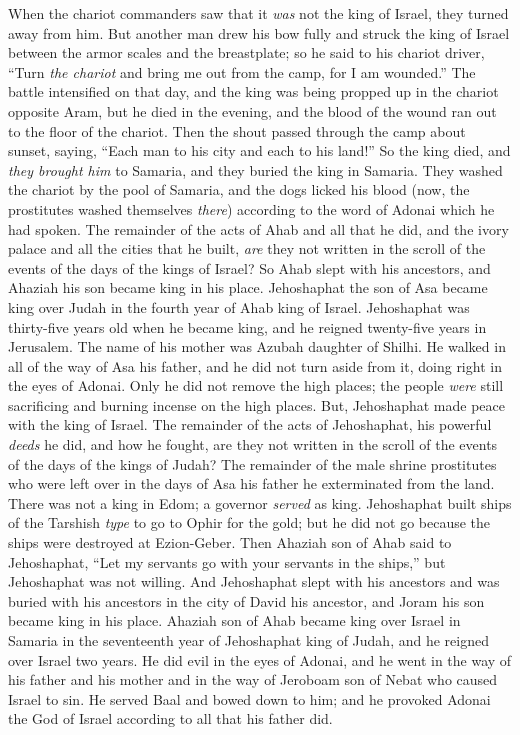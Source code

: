 \begin{biblechapter}
\verse When the chariot commanders saw that it \textit{was} not the king of Israel, they turned away from him.
\verse But another man drew his bow fully and struck the king of Israel between the armor scales and the breastplate; so he said to his chariot driver, “Turn \textit{the chariot} and bring me out from the camp, for I am wounded.”
\verse The battle intensified on that day, and the king was being propped up in the chariot opposite Aram, but he died in the evening, and the blood of the wound ran out to the floor of the chariot.
\verse Then the shout passed through the camp about sunset, saying, “Each man to his city and each to his land!”
\verse So the king died, and \textit{they brought him} to Samaria, and they buried the king in Samaria.
\verse They washed the chariot by the pool of Samaria, and the dogs licked his blood (now, the prostitutes washed themselves \textit{there}) according to the word of Adonai which he had spoken.
\verse The remainder of the acts of Ahab and all that he did, and the ivory palace and all the cities that he built, \textit{are} they not written in the scroll of the events of the days of the kings of Israel?
\verse So Ahab slept with his ancestors, and Ahaziah his son became king in his place.
 Jehoshaphat the son of Asa became king over Judah in the fourth year of Ahab king of Israel.
\verse Jehoshaphat was thirty-five years old when he became king, and he reigned twenty-five years in Jerusalem. The name of his mother was Azubah daughter of Shilhi.
\verse He walked in all of the way of Asa his father, and he did not turn aside from it, doing right in the eyes of Adonai. Only he did not remove the high places; the people \textit{were} still sacrificing and burning incense on the high places.
\verse  But, Jehoshaphat made peace with the king of Israel.
\verse The remainder of the acts of Jehoshaphat, his powerful \textit{deeds} he did, and how he fought, are they not written in the scroll of the events of the days of the kings of Judah?
\verse The remainder of the male shrine prostitutes who were left over in the days of Asa his father he exterminated from the land.
\verse There was not a king in Edom; a governor \textit{served} as king.
\verse Jehoshaphat built ships of the Tarshish \textit{type} to go to Ophir for the gold; but he did not go because the ships were destroyed at Ezion-Geber.
\verse Then Ahaziah son of Ahab said to Jehoshaphat, “Let my servants go with your servants in the ships,” but Jehoshaphat was not willing.
\verse And Jehoshaphat slept with his ancestors and was buried with his ancestors in the city of David his ancestor, and Joram his son became king in his place.
 Ahaziah son of Ahab became king over Israel in Samaria in the seventeenth year of Jehoshaphat king of Judah, and he reigned over Israel two years.
\verse He did evil in the eyes of Adonai, and he went in the way of his father and his mother and in the way of Jeroboam son of Nebat who caused Israel to sin.
\verse He served Baal and bowed down to him; and he provoked Adonai the God of Israel according to all that his father did.
\end{biblechapter}


